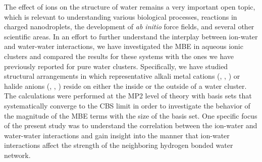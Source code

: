 \documentclass[11pt, proquest]{uwthesis}[2020/02/24]
\let\ce\ch
\begin{document}
\par The effect of ions on the structure of water remains a very important open topic, which is relevant to understanding various biological processes, reactions in charged nanodroplets, the development of \textit{ab initio} force fields, and several other scientific areas. In an effort to further understand the interplay between ion-water and water-water interactions, we have investigated the MBE in aqueous ionic clusters and compared the results for these systems with the ones we have previously reported for pure water clusters. Specifically, we have studied structural arrangements in which representative alkali metal cations (\ce{Li^+}, \ce{K^+}, \ce{Cs^+}) or halide anions (\ce{Cl^-}, \ce{Br^-}, \ce{I^-}) reside on either the inside or the outside of a water cluster. The calculations were performed at the MP2 level of theory with basis sets that systematically converge to the CBS limit in order to investigate the behavior of the magnitude of the MBE terms with the size of the basis set. One specific focus of the present study was to understand the correlation between the ion-water and water-water interactions and gain insight into the manner that ion-water interactions affect the strength of the neighboring hydrogen bonded water network.
\end{document}
